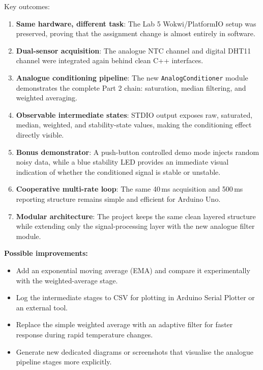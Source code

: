 \documentclass[12pt]{article}
\begin{document}
Key outcomes:
\begin{enumerate}
    \item \textbf{Same hardware, different task}: The Lab 5 Wokwi/PlatformIO setup was preserved, proving that the assignment change is almost entirely in software.
    \item \textbf{Dual-sensor acquisition}: The analogue NTC channel and digital DHT11 channel were integrated again behind clean C++ interfaces.
    \item \textbf{Analogue conditioning pipeline}: The new \texttt{AnalogConditioner} module demonstrates the complete Part 2 chain: saturation, median filtering, and weighted averaging.
    \item \textbf{Observable intermediate states}: STDIO output exposes raw, saturated, median, weighted, and stability-state values, making the conditioning effect directly visible.
    \item \textbf{Bonus demonstrator}: A push-button controlled demo mode injects random noisy data, while a blue stability LED provides an immediate visual indication of whether the conditioned signal is stable or unstable.
    \item \textbf{Cooperative multi-rate loop}: The same 40\,ms acquisition and 500\,ms reporting structure remains simple and efficient for Arduino Uno.
    \item \textbf{Modular architecture}: The project keeps the same clean layered structure while extending only the signal-processing layer with the new analogue filter module.
\end{enumerate}

\textbf{Possible improvements:}
\begin{itemize}
    \item Add an exponential moving average (EMA) and compare it experimentally with the weighted-average stage.
    \item Log the intermediate stages to CSV for plotting in Arduino Serial Plotter or an external tool.
    \item Replace the simple weighted average with an adaptive filter for faster response during rapid temperature changes.
    \item Generate new dedicated diagrams or screenshots that visualise the analogue pipeline stages more explicitly.
\end{itemize}
\end{document}
